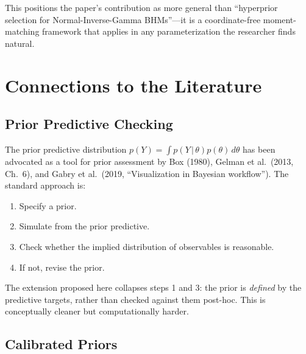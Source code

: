 \documentclass[11pt,a4paper]{article}
\theoremstyle{definition}
\newcommand{\given}{\,|\,}
\begin{document}
This positions the paper's contribution as more general than
``hyperprior selection for Normal-Inverse-Gamma BHMs''---it is a coordinate-free
moment-matching framework that applies in any parameterization the researcher
finds natural.


\section{Connections to the Literature}

\subsection{Prior Predictive Checking}

The prior predictive distribution $p(Y) = \int p(Y \given \theta) p(\theta)
\, d\theta$ has been advocated as a tool for prior assessment by Box (1980),
Gelman et al.\ (2013, Ch.~6), and Gabry et al.\ (2019, ``Visualization in
Bayesian workflow''). The standard approach is:
\begin{enumerate}
    \item Specify a prior.
    \item Simulate from the prior predictive.
    \item Check whether the implied distribution of observables is reasonable.
    \item If not, revise the prior.
\end{enumerate}
The extension proposed here collapses steps 1 and 3: the prior is
\emph{defined} by the predictive targets, rather than checked against them
post-hoc. This is conceptually cleaner but computationally harder.

\subsection{Calibrated Priors}
\end{document}
